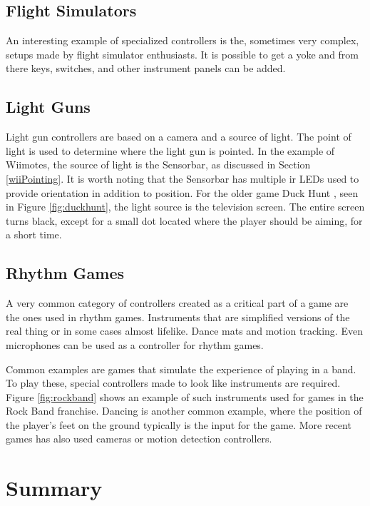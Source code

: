 \subsection{Flight Simulators}
An interesting example of specialized controllers is the, sometimes very complex, setups made by flight simulator enthusiasts.
It is possible to get a yoke and from there keys, switches, and other instrument panels can be added.

\subsection{Light Guns}
\label{lightguns}
Light gun controllers are based on a camera and a source of light.
The point of light is used to determine where the light gun is pointed.
In the example of Wiimotes, the source of light is the Sensorbar, as discussed in Section \ref{wiiPointing}.
It is worth noting that the Sensorbar has multiple \gls{ir} LEDs used to provide orientation in addition to position.
For the older game Duck Hunt \cite{duckhunt1984}, seen in Figure \ref{fig:duckhunt}, the light source is the television screen.
The entire screen turns black, except for a small dot located where the player should be aiming, for a short time.

\subsection{Rhythm Games}
A very common category of controllers created as a critical part of a game are the ones used in rhythm games.
Instruments that are simplified versions of the real thing or in some cases almost lifelike.
Dance mats and motion tracking.
Even microphones can be used as a controller for rhythm games.

Common examples are games that simulate the experience of playing in a band.
To play these, special controllers made to look like instruments are required.
Figure \ref{fig:rockband} shows an example of such instruments used for games in the Rock Band franchise.
Dancing is another common example, where the position of the player's feet on the ground typically is the input for the game.
More recent games has also used cameras or motion detection controllers.

\section{Summary}
